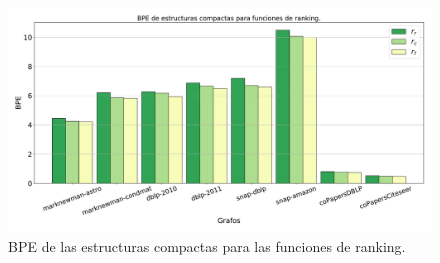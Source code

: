 \begin{figure}
    	\centering
    	\includegraphics[width=1\linewidth]{img/bpe3.pdf}
    	
    \caption{BPE de las estructuras compactas para las funciones de ranking.}
    \label{fig:bpe3}
\end{figure}
